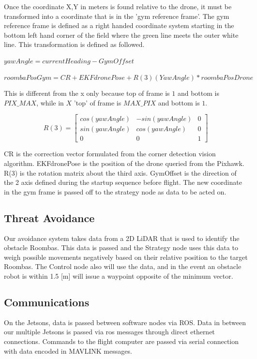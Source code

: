 \documentclass[12pt,letterpaper]{article}
\begin{document}
		Once the coordinate X,Y in meters is found relative to the drone, it must be transformed into a coordinate that is in the 'gym reference frame'. The gym reference frame is defined as a right handed coordinate system starting in the bottom left hand corner of the field where the green line meets the outer white line. This transformation is defined as followed.

		\begin{center}
			$yawAngle = currentHeading - GymOffset$
		\end{center}
		\begin{center}
			$roombaPosGym = CR + EKFdronePose + R(3)(YawAngle)*roombaPosDrone$
		\end{center}


		This is different from the x only because top of frame is $1$ and bottom is $PIX\_MAX$, while in $X$ 'top' of frame is $MAX\_PIX$ and bottom is $1$.

		\[
		R(3) =
			\begin{bmatrix}
			cos(yawAngle) & -sin(yawAngle) & 0 \\
			sin(yawAngle) & cos(yawAngle)  & 0 \\
			0 & 0 & 1
			\end{bmatrix}
		\]

		CR is the correction vector formulated from the corner detection vision algorithm. EKFdronePose is the position of the drone queried from the Pixhawk. R(3) is the rotation matrix about the third axis. GymOffset is the direction of the 2 axis defined during the startup sequence before flight. The new coordinate in the gym frame is passed off to the strategy node as data to be acted on.
	\subsection*{Threat Avoidance}
		Our avoidance system takes data from a 2D LiDAR that is used to identify the obstacle Roombas. This data is passed and the Strategy node uses this data to weigh possible movements negatively based on their relative position to the target Roombas. The Control node also will use the data, and in the event an obstacle robot is within 1.5 [m] will issue a waypoint opposite of the minimum vector.

	\subsection*{Communications}
		On the Jetsons, data is passed between software nodes via ROS. Data in between our multiple Jetsons is passed via ros messages through direct ethernet connections. Commands to the flight computer are passed via serial connection with data encoded in MAVLINK messages.
\end{document}
